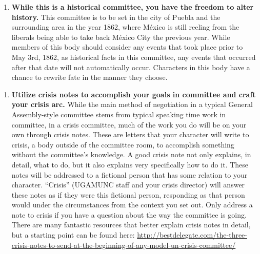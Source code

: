 \documentclass[10pt, letterpaper]{article}
\begin{document}
\begin{enumerate}
\def\labelenumi{\arabic{enumi}.}
\setcounter{enumi}{1}
\item
  
  \textbf{While this is a historical committee, you have the freedom to
  alter history.} This committee is to be set in the city of Puebla and
  the surrounding area in the year 1862, where México is still reeling
  from the liberals being able to take back México City the previous
  year. While members of this body should consider any events that took
  place prior to May 3rd, 1862, as historical facts in this committee,
  any events that occurred after that date will not automatically occur.
  Characters in this body have a chance to rewrite fate in the manner
  they choose.
  
\end{enumerate}

\begin{enumerate}
\def\labelenumi{\arabic{enumi}.}
\setcounter{enumi}{2}
\item
  
  \textbf{Utilize crisis notes to accomplish your goals in committee and
  craft your crisis arc.} While the main method of negotiation in a
  typical General Assembly-style committee stems from typical speaking
  time work in committee, in a crisis committee, much of the work you do
  will be on your own through crisis notes. These are letters that your
  character will write to crisis, a body outside of the committee room,
  to accomplish something without the committee's knowledge. A good
  crisis note not only explains, in detail, what to do, but it also
  explains very specifically how to do it. These notes will be addressed
  to a fictional person that has some relation to your character.
  ``Crisis'' (UGAMUNC staff and your crisis director) will answer these
  notes as if they were this fictional person, responding as that person
  would under the circumstances from the context you set out. Only
  address a note to crisis if you have a question about the way the
  committee is going. There are many fantastic resources that better
  explain crisis notes in detail, but a starting point can be found
  here:
  \href{http://bestdelegate.com/the-three-crisis-notes-to-send-at-the-beginning-of-any-model-un-crisis-committee/}{{http://bestdelegate.com/the-three-crisis-notes-to-send-at-the-beginning-of-any-model-un-crisis-committee/}}
  
\end{enumerate}
\end{document}
